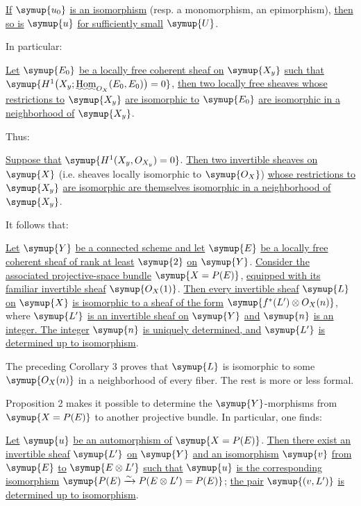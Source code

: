  \uline{If} $\symup{u_0}$ \uline{is an isomorphism} (resp. a monomorphism,
an epimorphism), \uline{then so is} $\symup{u}$ \uline{for sufficiently small} $\symup{U}$.

In particular:

 \uline{Let} $\symup{E_0}$ \uline{be a locally free coherent sheaf on} $\symup{X_y}$ \uline{such
that}
$\symup{H^1\bigl(X_y;\mathop{\text{\uwave{Hom}}}\nolimits_{O_X}(E_0,E_0)\bigr)=0}$,
\uline{then two locally free sheaves whose restrictions to} $\symup{X_y}$ \uline{are isomorphic to}
$\symup{E_0}$ \uline{are isomorphic in a neighborhood of} $\symup{X_y}$.

Thus:

 \uline{Suppose that} $\symup{H^1(X_y,O_{X_y})=0}$. \uline{Then two
invertible sheaves on} $\symup{X}$ (i.e. sheaves locally isomorphic to $\symup{O_X}$) \uline{whose
restrictions to} $\symup{X_y}$ \uline{are isomorphic are themselves isomorphic in a neighborhood of} $\symup{X_y}$.

It follows that:

 \uline{Let} $\symup{Y}$ \uline{be a connected scheme and let} $\symup{E}$ \uline{be a locally free coherent sheaf of rank at least} $\symup{2}$ \uline{on} $\symup{Y}$. \uline{Consider the associated projective-space bundle}
$\symup{X=P(E)}$, \uline{equipped with its familiar invertible sheaf} $\symup{O_X(1)}$.
\uline{Then every invertible sheaf} $\symup{L}$ \uline{on} $\symup{X}$ \uline{is isomorphic to a sheaf of the form}
$\symup{f^*(L')\otimes O_X(n)}$,
where $\symup{L'}$ \uline{is an invertible sheaf on} $\symup{Y}$ \uline{and} $\symup{n}$ \uline{is an integer. The integer}
$\symup{n}$ \uline{is uniquely determined, and} $\symup{L'}$ \uline{is determined up to isomorphism}.

The preceding Corollary 3 proves that $\symup{L}$ is isomorphic to some $\symup{O_X(n)}$ in
a neighborhood of every fiber. The rest is more or less formal.

Proposition 2 makes it possible to determine the $\symup{Y}$-morphisms from
$\symup{X=P(E)}$ to another projective bundle. In particular, one finds:

 \uline{Let} $\symup{u}$ \uline{be an automorphism of} $\symup{X=P(E)}$. \uline{Then
there exist an invertible sheaf} $\symup{L'}$ \uline{on} $\symup{Y}$ \uline{and an isomorphism}
$\symup{v}$ \uline{from} $\symup{E}$ \uline{to} $\symup{E\otimes L'}$ \uline{such that} $\symup{u}$ \uline{is the corresponding
isomorphism}
$\symup{P(E)\xrightarrow{\sim}P(E\otimes L')=P(E)}$;
\uline{the pair} $\symup{(v,L')}$ \uline{is determined up to isomorphism}.

